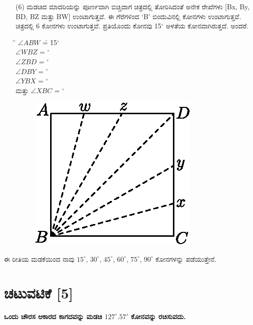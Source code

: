 \begin{itemize}
\item[(6)] ಮಡಚಿದ ಮಾದರಿಯನ್ನು ಪೂರ್ಣವಾಗಿ ಬಿಚ್ಚಿದಾಗ ಚಿತ್ರದಲ್ಲಿ ತೋರಿಸಿದಂತೆ ಅನೇಕ ರೇಖೆಗಳು [Bx, By, BD, BZ ಮತ್ತು  BW] ಉಂಟಾಗುತ್ತವೆ. ಈ ಗೆರೆಗಳಿಂದ `B' ಬಿಂದುವಿನಲ್ಲಿ ಕೋನಗಳು ಉಂಟಾಗುತ್ತವೆ. ಚಿತ್ರದಲ್ಲಿ 6 ಕೋನಗಳು ಉಂಟಾಗುತ್ತವೆ. ಪ್ರತಿಯೊಂದು ಕೋನವು  15$^\circ$ ಅಳತೆಯ ಕೋನವಾಗಿರುತ್ತದೆ. ಅಂದರೆ. 
\begin{tabbing}
\= \quad \quad \= $\angle  ABW$ \= = \= 15$^\circ$\\
\> \> $\angle WBZ$ \> = $^\circ$\\
\> \> $\angle  ZBD$ \> = $^\circ$\\
\> \> $\angle  DBY$ \> = $^\circ$\\
\> \> $\angle  YBX$ \> = $^\circ$ \\
ಮತ್ತು \> \> $\angle  XBC$ \> = $^\circ$
\end{tabbing}
\begin{figure}[H]
\centering
\includegraphics[scale=.98]{src/figure/chap1/fig1-10f.eps}
\end{figure}
\end{itemize}

ಈ ರೀತಿಯ ಮಡಕೆಯಿಂದ ನಾವು $15^\circ$, $30^\circ$, $45^\circ$, $60^\circ$, $75^\circ$, $90^\circ$ ಕೋನಗಳನ್ನು ಪಡೆಯುತ್ತೇನೆ. 

\section*{ಚಟುವಟಿಕೆ [5]} \textbf{ಒಂದು ಚೌರಸ ಆಕಾರದ ಕಾಗದವನ್ನು ಮಡಚಿ $127^\circ.57'$ ಕೋನವನ್ನು ರಚಿಸುವದು.}

